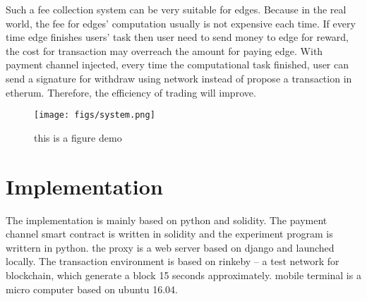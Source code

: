 \documentclass[10pt, conference, letterpaper]{IEEEtran}
\begin{document}
Such a fee collection system can be very suitable for edges. Because in the real world, the fee for edges' computation usually is not expensive each time. If every time edge finishes users' task then user need to send money to edge for reward, the cost for transaction may overreach the amount for paying edge. With payment channel injected, every time the computational task finished, user can send a signature for withdraw using network instead of propose a transaction in etherum. Therefore, the efficiency of trading will improve. 

\begin{figure}[ht]
\centering
\texttt{[image: figs/system.png]}
\caption{this is a figure demo}
\label{fig:label}
\end{figure}

\section{Implementation}
The implementation is mainly based on python and solidity. The payment channel smart contract is written in solidity and the experiment program is writtern in python. the proxy is a web server based on django and launched locally. The transaction environment is based on rinkeby -- a test network for blockchain, which generate a block 15 seconds approximately. mobile terminal is a micro computer based on ubuntu 16.04. 
\end{document}

